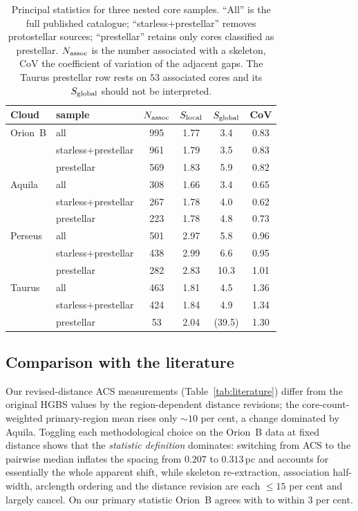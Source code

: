 \documentclass[usenatbib,twoside,twocolumn]{mnras}
\begin{document}
\begin{table}
\caption{Principal statistics for three nested core samples. ``All'' is the full published catalogue; ``starless$+$prestellar'' removes protostellar sources; ``prestellar'' retains only cores classified as prestellar. $N_{\rm assoc}$ is the number associated with a skeleton, CoV the coefficient of variation of the adjacent gaps. The Taurus prestellar row rests on $53$ associated cores and its $S_{\rm global}$ should not be interpreted.}
\label{tab:popsplit}
\footnotesize
\setlength{\tabcolsep}{4pt}
\begin{tabular}{llcccc}
\toprule
Cloud & sample & $N_{\rm assoc}$ & $S_{\rm local}$ & $S_{\rm global}$ & CoV \\
\midrule
Orion~B & all                  & 995 & 1.77 & 3.4 & 0.83 \\
        & starless$+$prestellar& 961 & 1.79 & 3.5 & 0.83 \\
        & prestellar           & 569 & 1.83 & 5.9 & 0.82 \\
\midrule
Aquila  & all                  & 308 & 1.66 & 3.4 & 0.65 \\
        & starless$+$prestellar& 267 & 1.78 & 4.0 & 0.62 \\
        & prestellar           & 223 & 1.78 & 4.8 & 0.73 \\
\midrule
Perseus & all                  & 501 & 2.97 & 5.8 & 0.96 \\
        & starless$+$prestellar& 438 & 2.99 & 6.6 & 0.95 \\
        & prestellar           & 282 & 2.83 & 10.3 & 1.01 \\
\midrule
Taurus  & all                  & 463 & 1.81 & 4.5 & 1.36 \\
        & starless$+$prestellar& 424 & 1.84 & 4.9 & 1.34 \\
        & prestellar           &  53 & 2.04 & (39.5) & 1.30 \\
\bottomrule
\end{tabular}
\end{table}

\subsection{Comparison with the literature}

Our revised-distance ACS measurements (Table~\ref{tab:literature}) differ from the original HGBS values by the region-dependent distance revisions; the core-count-weighted primary-region mean rises only $\sim10$ per cent, a change dominated by Aquila. Toggling each methodological choice on the Orion~B data at fixed distance shows that the \emph{statistic definition} dominates: switching from ACS to the pairwise median inflates the spacing from $0.207$ to $0.313$\,pc and accounts for essentially the whole apparent shift, while skeleton re-extraction, association half-width, arclength ordering and the distance revision are each $\leq15$ per cent and largely cancel. On our primary statistic Orion~B agrees with \citet{Konyves2020} to within $3$ per cent.
\end{document}
